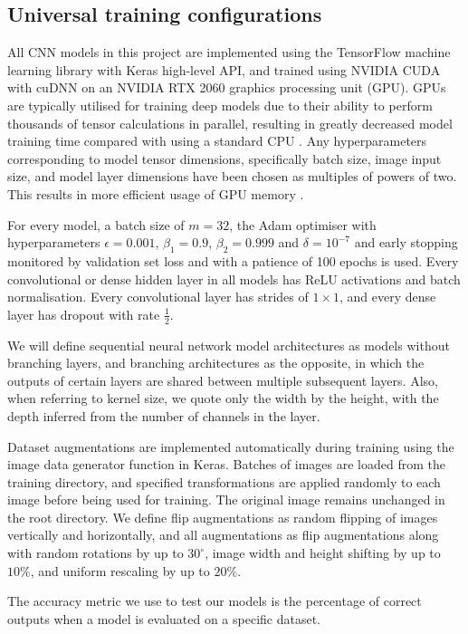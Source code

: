 \documentclass[12pt]{article}
\begin{document}
\subsection{Universal training configurations}
All CNN models in this project are implemented using the TensorFlow machine learning library with Keras high-level API, and trained using NVIDIA CUDA with cuDNN on an NVIDIA RTX 2060 graphics processing unit (GPU). GPUs are typically utilised for training deep models due to their ability to perform thousands of tensor calculations in parallel, resulting in greatly decreased model training time compared with using a standard CPU \cite{Shi16, Goodfellow16}. Any hyperparameters corresponding to model tensor dimensions, specifically batch size, image input size, and model layer dimensions have been chosen as multiples of powers of two. This results in more efficient usage of GPU memory \cite{Goodfellow16}. 

For every model, a batch size of $m=32$, the Adam optimiser with hyperparameters $\epsilon=0.001$, $\beta_1=0.9$, $\beta_2=0.999$ and $\delta=10^{-7}$ and early stopping  monitored by validation set loss and with a patience of 100 epochs is used. Every convolutional or dense hidden layer in all models has ReLU activations and batch normalisation. Every convolutional layer has strides of $1 \times 1$, and every dense layer has dropout with rate $\frac{1}{2}$.

We will define sequential neural network model architectures as models without branching layers, and branching architectures as the opposite, in which the outputs of certain layers are shared between multiple subsequent layers. Also, when referring to kernel size, we quote only the width by the height, with the depth inferred from the number of channels in the layer. 

Dataset augmentations are implemented automatically during training using the image data generator function in Keras. Batches of images are loaded from the training directory, and specified transformations are applied randomly to each image before being used for training. The original image remains unchanged in the root directory. We define flip augmentations as random flipping of images vertically and horizontally, and all augmentations as flip augmentations along with random rotations by up to $30^\circ$, image width and height shifting by up to $10\%$, and uniform rescaling by up to $20\%$.

The accuracy metric we use to test our models is the percentage of correct outputs when a model is evaluated on a specific dataset.
\end{document}
